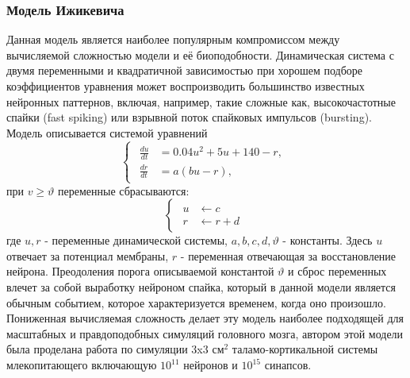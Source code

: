 \documentclass[a4paper,10pt]{article}
\begin{document}
\subsubsection{Модель Ижикевича}
\indent Данная модель является наиболее популярным компромиссом между вычисляемой сложностью модели и её биоподобности. Динамическая система с двумя переменными и квадратичной зависимостью при хорошем подборе коэффициентов уравнения может воспроизводить большинство известных нейронных паттернов\cite{IzhSimpleModel}, включая, например, такие сложные как, высокочастотные спайки (fast spiking) или взрывной поток спайковых импульсов (bursting).\\
\indent Модель описывается системой уравнений
\begin{equation}\label{eq:izh}
\left\{  \begin{array}{c} \begin{aligned}
	\frac{du}{dt} &= 0.04u^2+5u+140-r, \nonumber \\
	\frac{dr}{dt} &= a(bu-r), \nonumber 
	\end{aligned}	
	\end{array} \right.
\end{equation}
при $v \geq \vartheta$ переменные сбрасываются:
\begin{equation}\label{eq:izh_reset}
\left\{  \begin{array}{c} \begin{aligned}
	u &\leftarrow c \nonumber \\
	r &\leftarrow r+d
	\end{aligned}	
	\end{array} \right.
\end{equation}
где $u, r$ - переменные динамической системы, $a, b, c, d, \vartheta$ - константы. Здесь $u$ отвечает за потенциал мембраны, $r$ - переменная отвечающая за восстановление нейрона. Преодоления порога описываемой константой $\vartheta$ и сброс переменных влечет за собой выработку нейроном спайка, который в данной модели является обычным событием, которое характеризуется временем, когда оно произошло.\\
\indent Пониженная вычисляемая сложность делает эту модель наиболее подходящей для масштабных и правдоподобных симуляций головного мозга, автором этой модели была проделана работа \cite{IzhTalam} по симуляции 3x3 см$^2$ таламо-кортикальной системы млекопитающего включающую $10^{11}$ нейронов и $10^{15}$ синапсов.
\end{document}
